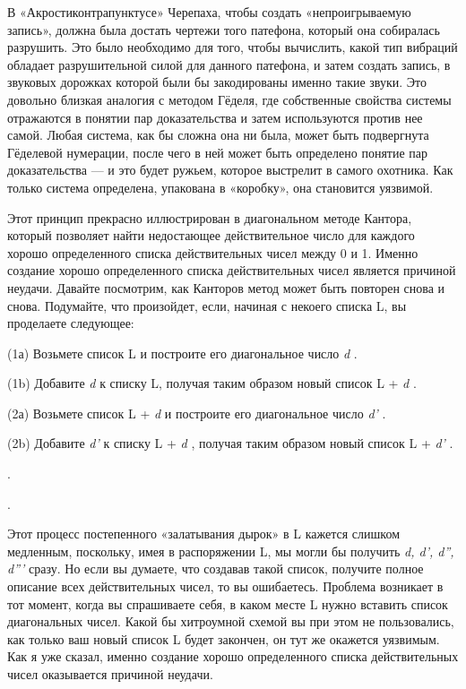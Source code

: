 В «Акростиконтрапунктусе» Черепаха, чтобы создать «непроигрываемую запись», должна была достать чертежи того патефона, который она собиралась разрушить. Это было необходимо для того, чтобы вычислить, какой тип вибраций обладает разрушительной силой для данного патефона, и затем создать запись, в звуковых дорожках которой были бы закодированы именно такие звуки. Это довольно близкая аналогия с методом Гёделя, где собственные свойства системы отражаются в понятии пар доказательства и затем используются против нее самой. Любая система, как бы сложна она ни была, может быть подвергнута Гёделевой нумерации, после чего в ней может быть определено понятие пар доказательства --- и это будет ружьем, которое выстрелит в самого охотника. Как только система определена, упакована в «коробку», она становится уязвимой.

Этот принцип прекрасно иллюстрирован в диагональном методе Кантора, который позволяет найти недостающее действительное число для каждого хорошо определенного списка действительных чисел между 0 и 1. Именно создание хорошо определенного списка действительных чисел является причиной неудачи. Давайте посмотрим, как Канторов метод может быть повторен снова и снова. Подумайте, что произойдет, если, начиная с некоего списка L, вы проделаете следующее:

(1а) Возьмете список L и построите его диагональное число \emph{d} .

(1b) Добавите \emph{d} к списку L, получая таким образом новый список L + \emph{d} .

(2а) Возьмете список L + \emph{d} и построите его диагональное число \emph{d'} .

(2b) Добавите \emph{d'} к списку L + \emph{d} , получая таким образом новый список L + \emph{d'} .

.

.

Этот процесс постепенного «залатывания дырок» в L кажется слишком медленным, поскольку, имея в распоряжении L, мы могли бы получить \emph{d, d', d'', d'''} сразу. Но если вы думаете, что создавав такой список, получите полное описание всех действительных чисел, то вы ошибаетесь. Проблема возникает в тот момент, когда вы спрашиваете себя, в каком месте L нужно вставить список диагональных чисел. Какой бы хитроумной схемой вы при этом не пользовались, как только ваш новый список L будет закончен, он тут же окажется уязвимым. Как я уже сказал, именно создание хорошо определенного списка действительных чисел оказывается причиной неудачи.

